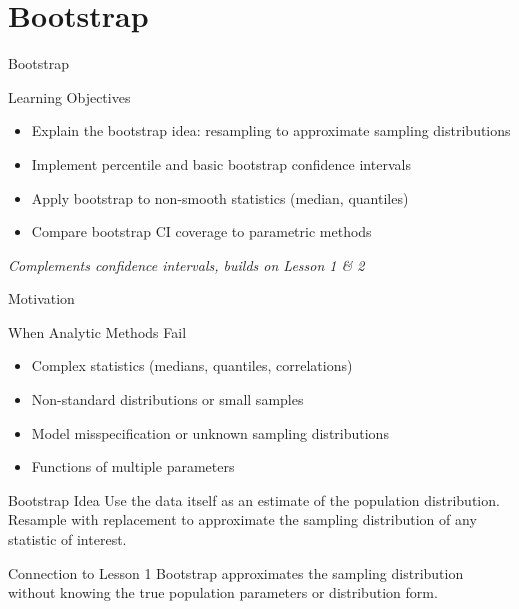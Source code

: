 
\section{Bootstrap}

\begin{frame}{Bootstrap}
  \begin{block}{Learning Objectives}
    \begin{itemize}
      \item Explain the bootstrap idea: resampling to approximate sampling distributions
      \item Implement percentile and basic bootstrap confidence intervals
      \item Apply bootstrap to non-smooth statistics (median, quantiles)
      \item Compare bootstrap CI coverage to parametric methods
    \end{itemize}
  \end{block}

  \vspace{1em}
  \begin{center}
    \textit{Complements confidence intervals, builds on Lesson 1 \& 2}
  \end{center}
\end{frame}

\begin{frame}{Motivation}
  \begin{block}{When Analytic Methods Fail}
    \begin{itemize}
      \item Complex statistics (medians, quantiles, correlations)
      \item Non-standard distributions or small samples
      \item Model misspecification or unknown sampling distributions
      \item Functions of multiple parameters
    \end{itemize}
  \end{block}

  \begin{block}{Bootstrap Idea}
    Use the data itself as an estimate of the population distribution.
    Resample with replacement to approximate the sampling distribution
    of any statistic of interest.
  \end{block}

  \begin{block}{Connection to Lesson 1}
    Bootstrap approximates the sampling distribution without knowing
    the true population parameters or distribution form.
  \end{block}
\end{frame}

